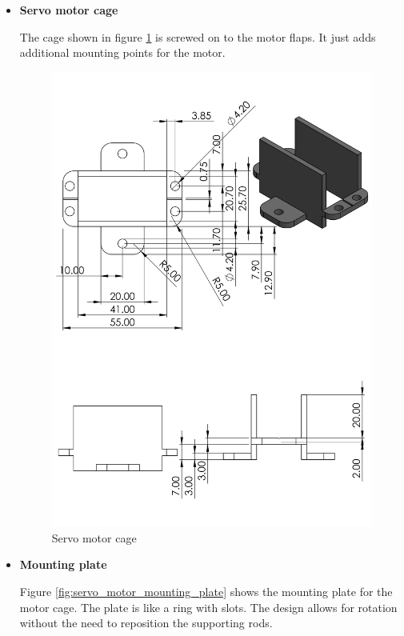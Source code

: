 \begin{enumerate}
\begin{enumerate}
\begin{enumerate}
\begin{itemize}
             \item \textbf{Servo motor cage}
            \par
            The cage shown in figure \ref{fig:servo_motor_cage} is screwed on to the motor flaps. It just adds additional mounting points for the motor. 
            \begin{figure}[H]
                \centering
                \includegraphics[height=.7\textheight]{Figures/ServoMotorHolder.PNG}
                \caption{Servo motor cage}
                \label{fig:servo_motor_cage}
            \end{figure}
            \par
            \item \textbf{Mounting plate}
            \par
            Figure \ref{fig:servo_motor_mounting_plate} shows the mounting plate for the motor cage. The plate is like a ring with slots. The design allows for rotation without the need to reposition the supporting rods. 

\end{itemize}
\end{enumerate}
\end{enumerate}
\end{enumerate}

